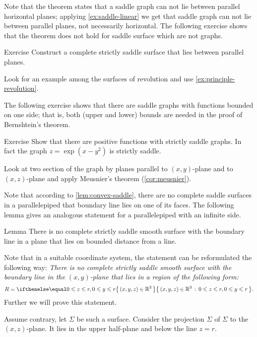 Note that the theorem states that a saddle graph can not lie between parallel horizontal planes;
applying \ref{ex:saddle-linear} we get that saddle graph can not lie between parallel planes,
not necessarily horizontal.
The following exercise shows that the theorem does not hold for saddle surface which are not graphs.


\begin{thm}{Exercise}\label{ex:between-parallels}
Construct a complete strictly saddle surface that lies between parallel planes.
\end{thm}

 Look for an example among the surfaces of revolution and use \ref{ex:principle-revolution}.


The following exercise shows that there are saddle graphs with functions bounded on one side; that is, both (upper and lower) bounds are needed in the proof of Bernshtein's theorem.

\begin{thm}{Exercise}\label{ex:one-side-bernshtein}
Show that there are positive functions with strictly saddle graphs.
In fact the graph
$z=\exp(x-y^2)$
is strictly saddle.
\end{thm}

 Look at two section of the graph by planes parallel to $(x,y)$-plane and to $(x,z)$-plane and apply Meusnier's theorem (\ref{cor:meusnier}).

Note that according to \ref{lem:convex-saddle}, there are no complete saddle surfaces in a parallelepiped that boundary line lies on one of its faces.
The following lemma gives an analogous statement for a parallelepiped with an infinite side.

\begin{thm}{Lemma}\label{lem:region}
There is no complete strictly saddle smooth surface 
with the boundary line in a plane
that lies on bounded distance from a line.
\end{thm}


Note that in a suitable coordinate system, the statement can be reformulated the following way:
\emph{There is no complete strictly saddle smooth surface 
with the boundary line in the $(x,y)$-plane
that lies in a region of the following form:}
\[R=\set{(x,y,z)\in\RR^3}{0\le z\le r, 0\le y\le r}.\]
Further we will prove this statement.

Assume contrary, let $\Sigma$ be such a surface.
Consider the projection $\hat \Sigma$ of $\Sigma$ to the $(x,z)$-plane.
It lies in the upper half-plane and below the line $z=r$.

